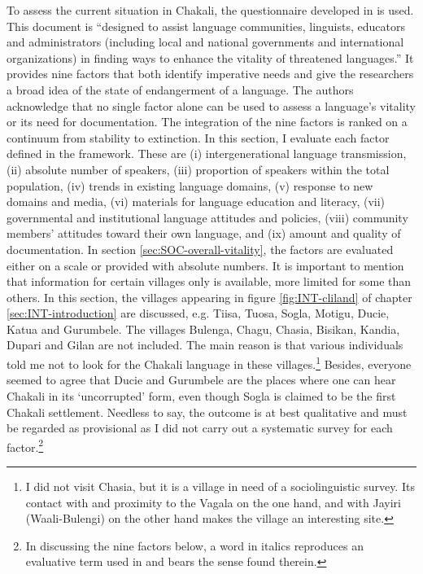 To assess the current situation in Chakali,  the questionnaire developed
in \cite{Reco03} is used. This   document is  ``designed to assist language
communities,
linguists, educators and administrators (including local and national
governments and international organizations) in finding ways to enhance the
vitality of threatened languages.''   It  provides  nine factors that
both  identify imperative needs and give the researchers a broad idea of the
state of endangerment of a language.  The authors acknowledge that no single
factor alone can be used to assess a language's vitality or its need for
documentation. The integration of the nine factors is ranked on a continuum from
stability to extinction.  In this section, I evaluate  each factor defined in
the framework. These are (i) intergenerational language transmission,
(ii)
absolute number of speakers, (iii) proportion of speakers within the total
population, (iv) trends in existing language domains, (v) response to new
domains and media,  (vi) materials for language education and literacy,
(vii) governmental and institutional language attitudes and policies, (viii)
community
members’ attitudes toward their own language, and (ix) amount and quality of
documentation.   In section
\ref{sec:SOC-overall-vitality}, the factors are
evaluated either on a scale or  provided with absolute numbers.  It is
important to mention that information for certain villages only is available,
more limited 
for some than others. In this section,  the villages
appearing in  figure \ref{fig:INT-cliland} of chapter
\ref{sec:INT-introduction} are discussed, e.g. Tiisa, Tuosa, Sogla, Motigu,
Ducie, Katua and Gurumbele. The
villages   Bulenga, Chagu, Chasia, Bisikan, Kandia,
Dupari and Gilan are not included.  The main reason is that various
individuals told me not to look for the Chakali language in these
villages.\footnote{I did not visit Chasia,  but it is a village in need of
a 
sociolinguistic survey. Its contact with and proximity to the
Vagala on the one hand, and  with Jayiri (Waali-Bulengi) on
the other hand  makes the village an interesting site.} Besides, everyone 
seemed
to agree that Ducie and Gurumbele are
the places where one can hear Chakali in its `uncorrupted' form, even though
Sogla is claimed to be the first Chakali settlement. Needless to say, the
outcome
is  at best qualitative and must be regarded as provisional as I did not carry
out a systematic survey for each
factor.\footnote{In discussing the nine factors below, a word in italics
reproduces an evaluative term used in
\cite{Reco03} and bears the sense found therein.} 





